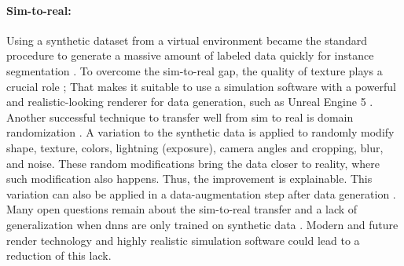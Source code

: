 		\paragraph{Sim-to-real:} Using a synthetic dataset from a virtual environment became the standard procedure to generate a massive amount of labeled data quickly for instance segmentation \cite{Danielczuk2019}\cite{Xie2020}\cite{Xie2021}\cite{Shao2018}\cite{Toda2019}. To overcome the sim-to-real gap, the quality of texture plays a crucial role \cite{Tabak2023}\cite{Martinez2019}; That makes it suitable to use a simulation software with a powerful and realistic-looking renderer for data generation, such as Unreal Engine 5 \cite{Romero2022}.\\
		Another successful technique to transfer well from sim to real is domain randomization \cite{Raj2023}. A variation to the synthetic data is applied to randomly modify shape, texture, colors, lightning (exposure), camera angles and cropping, blur, and noise. These random modifications bring the data closer to reality, where such modification also happens. Thus, the improvement is explainable. This variation can also be applied in a data-augmentation step after data generation \cite{Kar2022}.\\
		Many open questions remain about the sim-to-real transfer and a lack of generalization when \ac{dnn}s are only trained on synthetic data \cite{Doersch2019}. Modern and future render technology and highly realistic simulation software could lead to a reduction of this lack.
